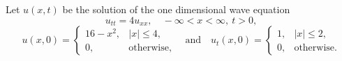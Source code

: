 \documentclass{article}
\begin{document}
																																																																																																																								      Let $u(x,t)$ be the solution of the one dimensional wave equation
																																																																																																																								      \[
																																																																																																																								      u_{tt} = 4u_{xx}, \quad -\infty < x < \infty,\ t > 0,
																																																																																																																								      \]
																																																																																																																								      \[
																																																																																																																								      u(x,0) =
																																																																																																																								      \begin{cases}
																																																																																																																								      16 - x^2, & |x| \leq 4, \\
																																																																																																																								      0, & \text{otherwise},
																																																																																																																								      \end{cases}
																																																																																																																								      \quad \text{and} \quad
																																																																																																																								      u_t(x,0) =
																																																																																																																								      \begin{cases}
																																																																																																																								      1, & |x| \leq 2, \\
																																																																																																																								      0, & \text{otherwise}.
																																																																																																																								      \end{cases}
																																																																																																																								      \]
\end{document}
